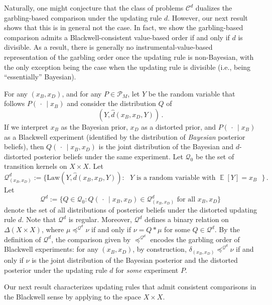 \documentclass[12pt,letterpaper]{article}
\newenvironment{original}{\color{black}}{}
\theoremstyle{plain}
\theoremstyle{definition}
\theoremstyle{remark}
\DeclareMathOperator{\E}{\mathds{E}}
\newcommand{\Pc}{\mathcal{P}}
\newcommand{\C}{\mathcal{C}}
\newcommand{\cQ}{\mathcal{Q}}
\theoremstyle{definition}
\begin{document}
\begin{original}
Naturally, one might conjecture that the class of problems $\C^d$ dualizes the garbling-based comparison under the updating rule $d$. However, our next result shows that this is in general not the case. In fact, we show the garbling-based comparison admits a Blackwell-consistent value-based order if and only if $d$ is divisible. As a result, there is generally no instrumental-value-based representation of the garbling order once the updating rule is non-Bayesian, with the only exception being the case when the updating rule is divisible (i.e., being ``essentially'' Bayesian).

For any $(x_B,x_D)$, and for any $P \in \Pc_M$, let $Y$ be the random variable that follows $P(\,\cdot\,\mid x_B)$ and consider the distribution $Q$ of
\[
(Y,\hat{d}(x_B,x_D,Y))\,.
\]
If we interpret $x_B$ as the Bayesian prior, $x_D$ as a distorted prior, and $P(\,\cdot\,\mid x_B)$ as a Blackwell experiment (identified by the distribution of \emph{Bayesian} posterior beliefs), then $Q(\,\cdot\,\mid x_B,x_D)$ is the joint distribution of the Bayesian and $d$-distorted posterior beliefs under the same experiment. Let $\mathcal{Q}_0$ be the set of transition kernels on $X\times X$. Let
\[\mathcal{Q}^{d}_{(x_B, x_D)}:= \Big\{ \text{Law}(Y, \hat{d}(x_B,x_D,Y)): \text{ $Y$ is a random variable with $\E[Y]=x_B$ }\Big\}\,.\]
Let
\[
\cQ^d:=\Big\{Q \in \cQ_0:  Q(\,\cdot\,\mid x_B, x_D) \in \mathcal{Q}^{d}_{(x_B, x_D)} \text{ for all $x_B, x_D$} \Big\}
\]
denote the set of all distributions of posterior beliefs under the distorted updating rule $d$. Note that $\cQ^d$ is regular. Moreover, $\cQ^d$ defines a binary relation on $\Delta(X\times X)$, where $\mu \preceq^{\cQ^d} \nu$ if and only if $\nu=Q*\mu$ for some $Q \in \cQ^d$. By the definition of $\cQ^d$, the comparison given by $\preceq^{\cQ^d}$ encodes the garbling order of Blackwell experiments: for any $(x_B, x_D)$, by construction, $\delta_{(x_B, x_D)} \preceq^{\cQ^d} \nu$ if and only if $\nu$ is the joint  distribution of the Bayesian posterior and the distorted posterior under the updating rule $d$ for \textit{some} experiment $P$.

Our next result characterizes updating rules that admit consistent comparisons in the Blackwell sense by applying  to the space $X \times X$.
\end{original}
\end{document}

